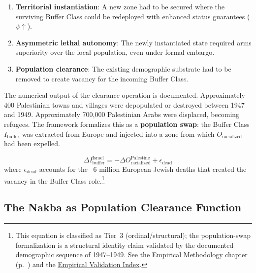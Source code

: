 \begin{enumerate}
    \item \textbf{Territorial instantiation}: A new zone had to be secured where the surviving Buffer Class could be redeployed with enhanced status guarantees ($\psi \uparrow$).
    \item \textbf{Asymmetric lethal autonomy}: The newly instantiated state required arms superiority over the local population, even under formal embargo.
    \item \textbf{Population clearance}: The existing demographic substrate had to be removed to create vacancy for the incoming Buffer Class.
\end{enumerate}

The numerical output of the clearance operation is documented. Approximately 400 Palestinian towns and villages were depopulated or destroyed between 1947 and 1949. Approximately 700,000 Palestinian Arabs were displaced, becoming refugees. The framework formalizes this as a \textbf{population swap}: the Buffer Class $I_{\text{buffer}}$ was extracted from Europe and injected into a zone from which $O_{\text{racialized}}$ had been expelled.

\begin{equation}\label{eq:gp1-population-swap}
\Delta I_{\text{buffer}}^{\text{Israel}} = -\Delta O_{\text{racialized}}^{\text{Palestine}} + \epsilon_{\text{dead}}
\end{equation}
where $\epsilon_{\text{dead}}$ accounts for the ~6 million European Jewish deaths that created the vacancy in the Buffer Class role.\footnote{This equation is classified as Tier~3 (ordinal/structural); the population-swap formalization is a structural identity claim validated by the documented demographic sequence of 1947--1949. See the Empirical Methodology chapter (p.~\pageref{ch:empirical_methodology}) and the \hyperref[app:empirical_index]{Empirical Validation Index}.}

\subsection{The Nakba as Population Clearance Function}

